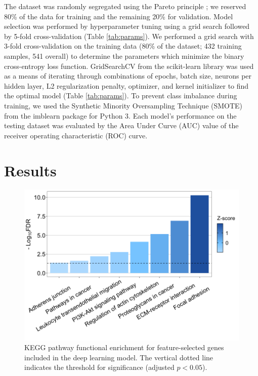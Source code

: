 \documentclass[10pt, letterpaper]{article}
\begin{document}
\begin{multicols*}{2}
The dataset was randomly segregated using the Pareto principle \cite{pareto}; we reserved 80\% of the data for training and the remaining 20\% for validation. Model selection was performed by hyperparameter tuning using a grid search followed by 5-fold cross-validation (Table \ref{tab:params}). We performed a grid search with 3-fold cross-validation on the training data (80\% of the dataset; 432 training samples, 541 overall) to determine the parameters which minimize the binary cross-entropy loss function. GridSearchCV from the scikit-learn library \cite{scikit-learn} was used as a means of iterating through combinations of epochs, batch size, neurons per hidden layer, L2 regularization penalty, optimizer, and kernel initializer to find the optimal model (Table \ref{tab:params}). To prevent class imbalance during training, we used the Synthetic Minority Oversampling Technique (SMOTE) from the imblearn package \cite{imblearn} for Python 3. Each model’s performance on the testing dataset was evaluated by the Area Under Curve (AUC) value of the receiver operating characteristic (ROC) curve.


\section{Results}

\begin{figure}[!ht]
	\centering
	\includegraphics[width=\textwidth]{Figures/kegg.png}
	\caption{KEGG pathway functional enrichment for feature-selected genes included in the deep learning model. The vertical dotted line indicates the threshold for significance (adjusted $p < 0.05$).}
	\label{fig:kegg}
\end{figure}


\end{multicols*}
\end{document}
